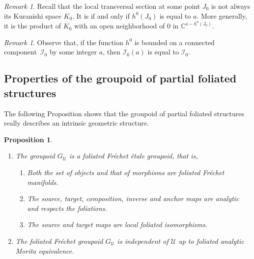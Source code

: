 \documentclass[JEP,XML,SOM,Unicode]{cedram}
\let\mathcal\mathscr
\renewcommand{\theenumi}{\roman{enumi}}%
\theoremstyle{plain}
\newtheorem{proposition}[theorem]{Proposition}
\theoremstyle{definition}
\theoremstyle{remark}
\newtheorem{remark}[theorem]{Remark}
\numberwithin{equation}{section}
\newcommand{\CC}{{\mathbb{C}}}
\newcommand{\cI}{\mathcal{I}}
\begin{document}
\begin{remark}
\label{newK}
Recall that the local transversal section at some point $J_0$ is not always its Kuranishi space $K_0$. It is if and only if $h^0(J_0)$ is equal to $a$. More generally, it is the product of $K_0$ with an open neighborhood of $0$ in $\CC^{a-h^0(J_0)}$.
\end{remark}

\begin{remark}
\label{CaETI}
Observe that, if the function $h^0$ is bounded on a connected component~$\cI_0$ by some integer $a$, then $\cI_0(a)$ is equal to $\cI_0$.
\end{remark}

\subsection{Properties of the groupoid of partial foliated structures}
\label{groupoidpfs}

The following Proposition shows that the groupoid of partial foliated structures really describes an intrinsic geometric structure.

\skpt
\begin{proposition}
\label{groupoidI}
\begin{enumerate}\renewcommand{\theenumi}{\Roman{enumi}}\renewcommand{\theenumii}{\roman{enumii}}
\item\label{groupoidI1}
The groupoid $G_{\mathcal U}$ is a foliated Fréchet étale groupoid, that is,
\begin{enumerate}
\item\label{groupoidI1i}
Both the set of objects and that of morphisms are foliated Fréchet manifolds.
\item\label{groupoidI1ii}
The source, target, composition, inverse and anchor maps are analytic and respects the foliations.
\item\label{groupoidI1iii}
The source and target maps are local foliated isomorphisms.
\end{enumerate}
\item\label{groupoidI2}
The foliated Fréchet groupoid $G_{\mathcal U}$ is independent of $\mathcal U$ up to foliated analytic Morita equivalence.
\end{enumerate}
\end{proposition}
\end{document}
